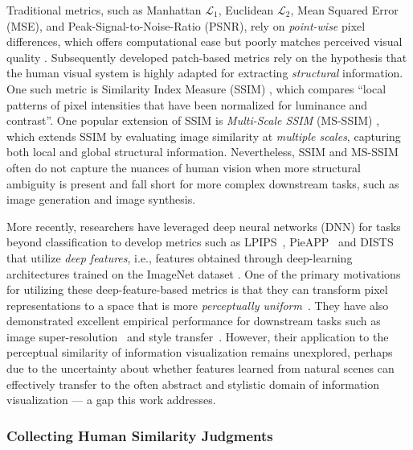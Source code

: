 \documentclass[sigconf]{acmart}
\begin{document}
Traditional metrics, such as Manhattan $\mathcal{L}_1$, Euclidean $\mathcal{L}_2$, Mean Squared Error (MSE), and Peak-Signal-to-Noise-Ratio (PSNR), rely on \textit{point-wise} pixel differences, which offers computational ease but poorly matches perceived visual quality \cite{wangImageQualityAssessment2004, eskicioglu1995image, girod1993s}. Subsequently developed patch-based metrics rely on the hypothesis that the human visual system is highly adapted for extracting \textit{structural} information. One such metric is Similarity Index Measure (SSIM) \cite{wangImageQualityAssessment2004}, which compares ``local patterns of pixel intensities that have been normalized for luminance and contrast''. One popular extension of SSIM is \textit{Multi-Scale SSIM} (MS-SSIM) \cite{wang2003multiscale}, which extends SSIM by evaluating image similarity at \textit{multiple scales}, capturing both local and global structural information. Nevertheless, SSIM and MS-SSIM often do not capture the nuances of human vision when more structural ambiguity is present \cite{sampat2009complex} and fall short for more complex downstream tasks, such as image generation and image synthesis. 

More recently, researchers have leveraged deep neural networks (DNN) for tasks beyond classification to develop metrics such as LPIPS~\cite{zhangUnreasonableEffectivenessDeep2018}, PieAPP~\cite{prashnaniPieAPPPerceptualImageError2018} and DISTS~\cite{dingImageQualityAssessment2020} that utilize \textit{deep features}, i.e., features obtained through deep-learning architectures trained on the ImageNet dataset \cite{deng2009imagenet}. One of the primary motivations for utilizing these deep-feature-based metrics is that they can transform pixel representations to a space that is more \textit{perceptually uniform}~\cite{dingImageQualityAssessment2020}. They have also demonstrated excellent empirical performance for downstream tasks such as image super-resolution~\cite{johnson2016perceptual} and style transfer~\cite{gatysNeuralAlgorithmArtistic2015}. However, their application to the perceptual similarity of information visualization remains unexplored, perhaps due to the uncertainty about whether features learned from natural scenes can effectively transfer to the often abstract and stylistic domain of information visualization --- a gap this work addresses. 

\subsubsection{Collecting Human Similarity Judgments} 
\label{sec:collect_human_judgment}
\end{document}
